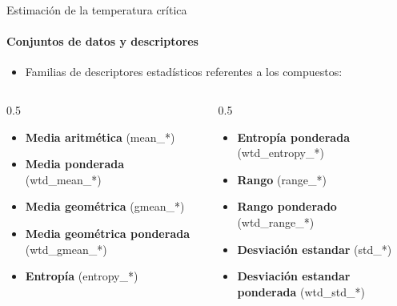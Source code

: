 \documentclass{beamer}
\begin{document}
\begin{frame}{\LARGE Estimación de la temperatura crítica}
    \framesubtitle{Conjuntos de datos y descriptores}
    \begin{itemize}
        \item Familias de descriptores estadísticos referentes a los compuestos:
    \end{itemize}
    \begin{columns}[T]
            \begin{column}{0.5\textwidth}
                \begin{itemize}
                    \item \textbf{Media aritmética} (mean\_*)
                    \item \textbf{Media ponderada} (wtd\_mean\_*)
                    \item \textbf{Media geométrica} (gmean\_*)
                    \item \textbf{Media geométrica ponderada} (wtd\_gmean\_*)
                    \item \textbf{Entropía} (entropy\_*)
                \end{itemize}
            \end{column}

            \begin{column}{0.5\textwidth}
                \begin{itemize}
                    \item \textbf{Entropía ponderada} (wtd\_entropy\_*)
                    \item \textbf{Rango} (range\_*)
                    \item \textbf{Rango ponderado} (wtd\_range\_*)
                    \item \textbf{Desviación estandar} (std\_*)
                    \item \textbf{Desviación estandar ponderada} (wtd\_std\_*)
                \end{itemize}
            \end{column}
        \end{columns}
\end{frame}
\end{document}
